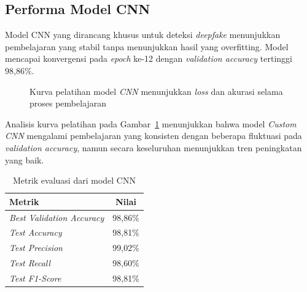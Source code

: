 \subsection{Performa Model CNN}

Model CNN yang dirancang khusus untuk deteksi \textit{deepfake} menunjukkan pembelajaran yang stabil tanpa menunjukkan hasil yang overfitting. Model mencapai konvergensi pada \textit{epoch} ke-12 dengan \textit{validation accuracy} tertinggi 98,86\%.

\begin{figure}[H]
    \centering
    \caption{Kurva pelatihan model \textit{CNN} menunjukkan \textit{loss} dan akurasi selama proses pembelajaran}
    \label{fig:cnn_training}
\end{figure}


Analisis kurva pelatihan pada Gambar~\ref{fig:cnn_training} menunjukkan bahwa model \textit{Custom CNN} mengalami pembelajaran yang konsisten dengan beberapa fluktuasi pada \textit{validation accuracy}, namun secara keseluruhan menunjukkan tren peningkatan yang baik.

\begin{table}[H]
\centering
\caption{Metrik evaluasi dari model CNN}
\label{tab:cnn_results}
\begin{tabular}{|l|c|}
\hline
\textbf{Metrik} & \textbf{Nilai} \\
\hline
\textit{Best Validation Accuracy} & 98,86\% \\
\textit{Test Accuracy} & 98,81\% \\
\textit{Test Precision} & 99,02\% \\
\textit{Test Recall} & 98,60\% \\
\textit{Test F1-Score} & 98,81\% \\
\hline
\end{tabular}
\end{table}

